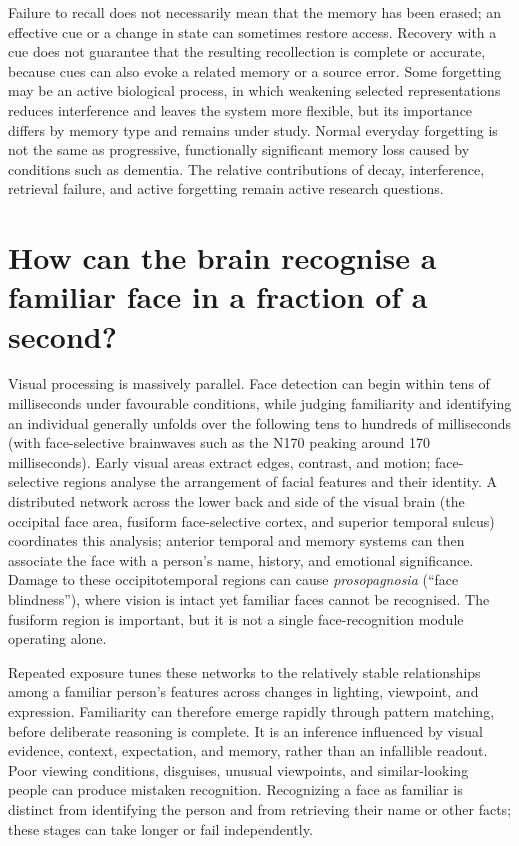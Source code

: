 \documentclass[11pt,oneside]{report}
\begin{document}
Failure to recall does not necessarily mean that the memory has been erased;
an effective cue or a change in state can sometimes restore access. Recovery
with a cue does not guarantee that the resulting recollection is complete or
accurate, because cues can also evoke a related memory or a source error. Some
forgetting may be an active biological process, in which weakening selected
representations reduces interference and leaves the system more flexible, but
its importance differs by memory type and remains under study. Normal everyday
forgetting is not the same as progressive, functionally significant memory loss
caused by conditions such as dementia. The relative contributions of decay,
interference, retrieval failure, and active forgetting remain active research
questions.

\section{How can the brain recognise a familiar face in a fraction of a second?}

Visual processing is massively parallel. Face detection can begin within tens
of milliseconds under favourable conditions, while judging familiarity and
identifying an individual generally unfolds over the following tens to hundreds
of milliseconds (with face-selective brainwaves such as the N170 peaking around
170 milliseconds). Early visual areas extract edges, contrast, and motion;
face-selective regions analyse the arrangement of facial features and their
identity. A distributed network across the lower back and side of the visual
brain (the occipital face area, fusiform face-selective cortex, and superior
temporal sulcus) coordinates this analysis; anterior temporal and memory
systems can then associate the face with a person's name, history, and
emotional significance. Damage to these occipitotemporal regions can cause
\emph{prosopagnosia} (``face blindness''), where vision is intact yet familiar
faces cannot be recognised. The fusiform region is important, but it is not a
single face-recognition module operating alone.

Repeated exposure tunes these networks to the relatively stable relationships
among a familiar person's features across changes in lighting, viewpoint, and
expression. Familiarity can therefore emerge rapidly through pattern matching,
before deliberate reasoning is complete. It is an inference influenced by visual
evidence, context, expectation, and memory, rather than an infallible readout.
Poor viewing conditions, disguises, unusual viewpoints, and similar-looking
people can produce mistaken recognition. Recognizing a face as
familiar is distinct from identifying the person and from retrieving their name
or other facts; these stages can take longer or fail independently.
\end{document}
